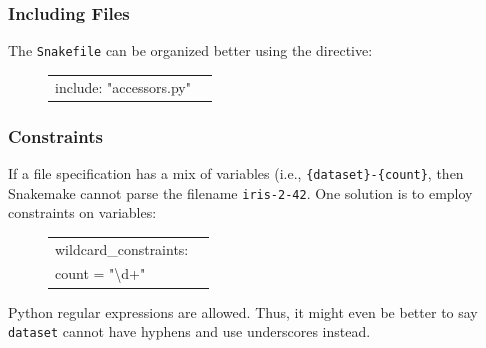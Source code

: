 \begin{frame}

\frametitle{Including Files}

The {\texttt{Snakefile}} can be organized better using the {} directive:
\vs

\begin{figure}
  \begin{tabular}{lc}
  include:  "accessors.py" \\
  \end{tabular}
\end{figure}

\end{frame}


\begin{frame}

\frametitle{Constraints}

If a file specification has a mix of variables (i.e., {\texttt{\{dataset\}-\{count\}}}, then Snakemake cannot parse the filename {\texttt{iris-2-42}}.  One solution is to employ constraints on variables:

\begin{figure}
  \begin{tabular}{lc}
  wildcard\_constraints: \\
  {\D\D}count = "{\textbackslash}d+" \\
  \end{tabular}
\end{figure}

Python regular expressions are allowed.  Thus, it might even be better to say {\texttt{dataset}} cannot have hyphens and use underscores instead.

\end{frame}


